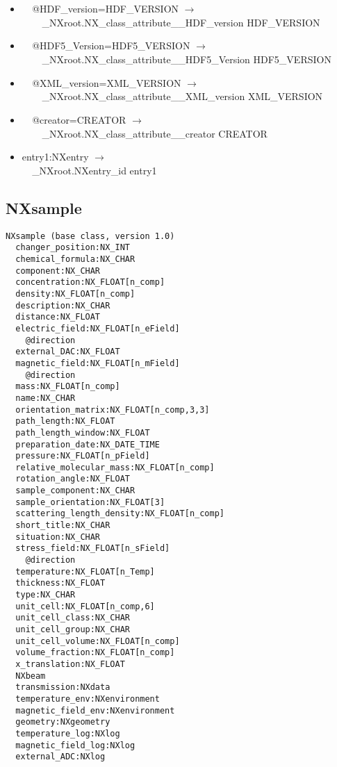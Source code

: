 \documentclass[11pt]{article}
\begin{document}
{{\begin{itemize}
\item{\verb|  |@HDF\_version=HDF\_VERSION $\rightarrow$\\
\verb|    |\_NXroot.NX\_class\_attribute\_\_HDF\_version HDF\_VERSION}

\item{\verb|  |@HDF5\_Version=HDF5\_VERSION $\rightarrow$\\
\verb|    |\_NXroot.NX\_class\_attribute\_\_HDF5\_Version HDF5\_VERSION}

\item{\verb|  |@XML\_version=XML\_VERSION $\rightarrow$\\
\verb|    |\_NXroot.NX\_class\_attribute\_\_XML\_version XML\_VERSION}

\item{\verb|  |@creator=CREATOR $\rightarrow$\\
\verb|    |\_NXroot.NX\_class\_attribute\_\_creator CREATOR}

\item{entry1:NXentry $\rightarrow$\\
\verb|  |\_NXroot.NXentry\_id entry1}
\end{itemize}
\subsection{NXsample}

\begin{verbatim}
NXsample (base class, version 1.0)
  changer_position:NX_INT
  chemical_formula:NX_CHAR
  component:NX_CHAR
  concentration:NX_FLOAT[n_comp]
  density:NX_FLOAT[n_comp]
  description:NX_CHAR
  distance:NX_FLOAT
  electric_field:NX_FLOAT[n_eField]
    @direction
  external_DAC:NX_FLOAT
  magnetic_field:NX_FLOAT[n_mField]
    @direction
  mass:NX_FLOAT[n_comp]
  name:NX_CHAR
  orientation_matrix:NX_FLOAT[n_comp,3,3]
  path_length:NX_FLOAT
  path_length_window:NX_FLOAT
  preparation_date:NX_DATE_TIME
  pressure:NX_FLOAT[n_pField]
  relative_molecular_mass:NX_FLOAT[n_comp]
  rotation_angle:NX_FLOAT
  sample_component:NX_CHAR
  sample_orientation:NX_FLOAT[3]
  scattering_length_density:NX_FLOAT[n_comp]
  short_title:NX_CHAR
  situation:NX_CHAR
  stress_field:NX_FLOAT[n_sField]
    @direction
  temperature:NX_FLOAT[n_Temp]
  thickness:NX_FLOAT
  type:NX_CHAR
  unit_cell:NX_FLOAT[n_comp,6]
  unit_cell_class:NX_CHAR
  unit_cell_group:NX_CHAR
  unit_cell_volume:NX_FLOAT[n_comp]
  volume_fraction:NX_FLOAT[n_comp]
  x_translation:NX_FLOAT
  NXbeam
  transmission:NXdata
  temperature_env:NXenvironment
  magnetic_field_env:NXenvironment
  geometry:NXgeometry
  temperature_log:NXlog
  magnetic_field_log:NXlog
  external_ADC:NXlog
\end{verbatim}

}}
\end{document}
